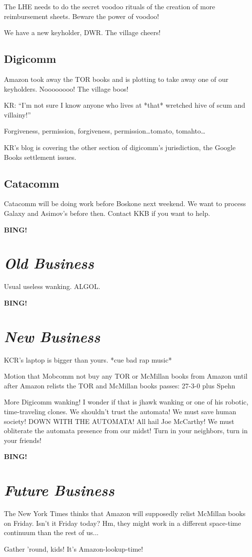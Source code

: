 \documentclass[10pt]{article}
\newcommand{\bing}{{\bf BING!} }
\newcommand{\goto}[1]{\bing \vskip 12pt \section*{{\em{#1}}}}
\newcommand{\ps}{ plus Spehn\xspace}
\begin{document}
The LHE needs to do the secret voodoo rituals of the creation of more reimbursement sheets.  Beware the power of voodoo!

We have a new keyholder, DWR.  The village cheers!

\subsection*{Digicomm}

Amazon took away the TOR books and is plotting to take away one of our keyholders.  Noooooooo!  The village boos!

KR: ``I'm not sure I know anyone who lives at *that* wretched hive of scum and villainy!''

Forgiveness, permission, forgiveness, permission\ldots tomato, tomahto\ldots

KR's blog is covering the other section of digicomm's jurisdiction, the Google Books settlement issues.

\subsection*{Catacomm}

Catacomm will be doing work before Boskone next weekend.  We want to process Galaxy and Asimov's before then.  Contact KKB if you want to help.

\goto{Old Business}

Usual useless wanking.  ALGOL.

\goto{New Business}

KCR's laptop is bigger than yours.  *cue bad rap music*

Motion that Mobcomm not buy any TOR or McMillan books from Amazon until after Amazon relists the TOR and McMillan books passes: 27-3-0 \ps

More Digicomm wanking!  I wonder if that is jhawk wanking or one of his robotic, time-traveling clones.  We shouldn't trust the automata!  We must save human society!  DOWN WITH THE AUTOMATA!  All hail Joe McCarthy!  We must obliterate the automata presence from our midst!  Turn in your neighbors, turn in your friends!

\goto{Future Business}

The New York Times thinks that Amazon will supposedly relist McMillan books on Friday.  Isn't it Friday today?  Hm, they might work in a different space-time continuum than the rest of us...

Gather 'round, kids!  It's Amazon-lookup-time!
\end{document}
